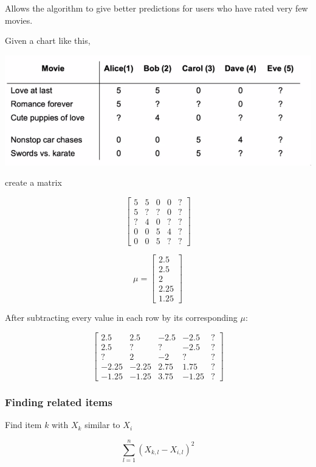 \documentclass[12pt]{article}
\begin{document}
Allows the algorithm to give better predictions for users who have rated very few movies.

Given a chart like this,

\includegraphics[scale=.5]{movies}

create a matrix

\[
\begin{bmatrix}
    5 & 5 & 0 & 0 & ?\\
    5 & ? & ? & 0 & ?\\
    ? & 4 & 0 & ? & ?\\
    0 & 0 & 5 & 4 & ?\\
    0 & 0 & 5 & ? & ?
\end{bmatrix}
\]

\[
    \mu =
    \begin{bmatrix}
        2.5\\
        2.5\\
        2\\
        2.25\\
        1.25
    \end{bmatrix}
\]

After subtracting every value in each row by its corresponding $\mu$:

\[
    \begin{bmatrix}
        2.5 & 2.5 & -2.5 & -2.5 & ?\\
        2.5 & ? & ? & -2.5 & ?\\
        ? & 2 & -2 & ? & ?\\
        -2.25 & -2.25 & 2.75 & 1.75 & ?\\
        -1.25 & -1.25 & 3.75 & -1.25 & ?
    \end{bmatrix}
\]

\subsubsection{Finding related items}

Find item $k$ with $X_k$ similar to $X_i$

\[ \sum_{l=1}^n (X_{k,l} - X_{i,l})^2 \]
\end{document}
